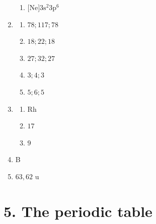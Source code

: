 \begin{multicols}{4}
\begin{enumerate}[noitemsep, label=\textbf{\arabic*}. ]
\begin{enumerate}[noitemsep, label=\textbf{(\alph*)} ]
    \item $\text{[Ne]} 3\text{s}^2 3\text{p}^6$
    \end{enumerate}
\item %
    \begin{enumerate}[noitemsep, label=\textbf{(\alph*)} ]
    \item $78 ; 117 ; 78$
    \item $18 ; 22 ; 18$
    \item $27 ; 32 ; 27$
    \item $3 ; 4 ; 3$
    \item $5 ; 6 ; 5$
    \end{enumerate}
\item %
  \begin{enumerate}[noitemsep, label=\textbf{(\alph*)} ]
  \item Rh
  \item $17$
  \item $9$
  \end{enumerate}
\item %
B
\item %
$63,62 \text{ u}$
\end{enumerate}
\end{multicols}
\section {5. The periodic table}
